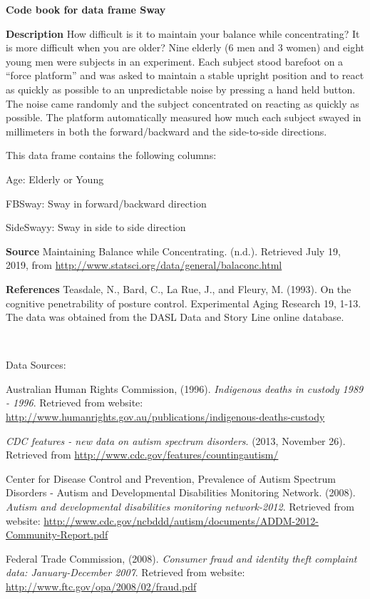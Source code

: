 \documentclass[
]{book}
\begin{document}
\textbf{Code book for data frame Sway}

\textbf{Description}
How difficult is it to maintain your balance while concentrating? It is more difficult when you are older? Nine elderly (6 men and 3 women) and eight young men were subjects in an experiment. Each subject stood barefoot on a ``force platform'' and was asked to maintain a stable upright position and to react as quickly as possible to an unpredictable noise by pressing a hand held button. The noise came randomly and the subject concentrated on reacting as quickly as possible. The platform automatically measured how much each subject swayed in millimeters in both the forward/backward and the side-to-side directions.

This data frame contains the following columns:

Age: Elderly or Young

FBSway: Sway in forward/backward direction

SideSwayy: Sway in side to side direction

\textbf{Source}
Maintaining Balance while Concentrating. (n.d.). Retrieved July 19, 2019, from \url{http://www.statsci.org/data/general/balaconc.html}

\textbf{References}
Teasdale, N., Bard, C., La Rue, J., and Fleury, M. (1993). On the cognitive penetrability of posture control. Experimental Aging Research 19, 1-13.
The data was obtained from the DASL Data and Story Line online database.

\textbf{\\
}

Data Sources:

Australian Human Rights Commission, (1996). \emph{Indigenous deaths in
custody 1989 - 1996}. Retrieved from website:
\url{http://www.humanrights.gov.au/publications/indigenous-deaths-custody}

\emph{CDC features - new data on autism spectrum disorders}. (2013, November
26). Retrieved from \url{http://www.cdc.gov/features/countingautism/}

Center for Disease Control and Prevention, Prevalence of Autism Spectrum
Disorders - Autism and Developmental Disabilities Monitoring Network.
(2008). \emph{Autism and developmental disabilities monitoring network-2012}.
Retrieved from website:
\url{http://www.cdc.gov/ncbddd/autism/documents/ADDM-2012-Community-Report.pdf}

Federal Trade Commission, (2008). \emph{Consumer fraud and identity theft
complaint data: January-December 2007}. Retrieved from website:
\url{http://www.ftc.gov/opa/2008/02/fraud.pdf}
\end{document}
